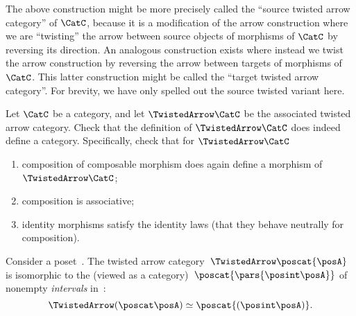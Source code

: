\begin{remark}
    The above construction might be more precisely called the ``source twisted arrow category'' of $\CatC$, because it is a modification of the arrow construction where we are ``twisting'' the arrow between source objects of morphisms of $\CatC$ by reversing its direction.
    An analogous construction exists where instead we twist the arrow construction by reversing the arrow between targets of morphisms of $\CatC$.
    This latter construction might be called the ``target twisted arrow category''.
    For brevity, we have only spelled out the source twisted variant here.
\end{remark}

\begin{gradedexercise}
    \label{ex:TwistedCat}

    Let $\CatC$ be a category, and let $\TwistedArrow\CatC$ be the associated twisted arrow category.
    Check that the definition of $\TwistedArrow\CatC$ does indeed define a category.
    Specifically, check that for $\TwistedArrow\CatC$
    \begin{enumerate}
        \item composition of composable morphism does again define a morphism of $\TwistedArrow\CatC$;
        \item composition is associative;
        \item identity morphisms satisfy the identity laws (that they behave neutrally for composition).
    \end{enumerate}
\end{gradedexercise}


\begin{example}
    \label{exa:twisted-arrow-poset}
    Consider a poset~\posA.
    The twisted arrow category~$\TwistedArrow \poscat{\posA}$ is isomorphic to the  (viewed as a category)~$\poscat{\pars{\posint\posA}}$ of nonempty \emph{intervals} in~\posA:
    \begin{equation}
        \TwistedArrow (\poscat \posA) \simeq \poscat{(\posint\posA)}.
    \end{equation}
\end{example}

